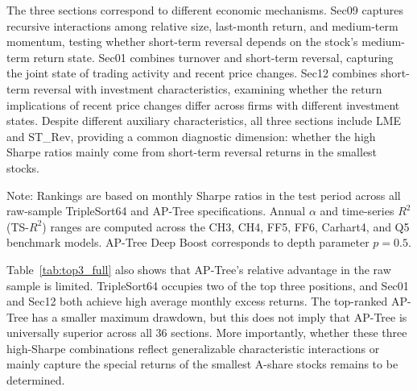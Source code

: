 \documentclass[12pt]{article}
\def\textit#1{#1}%
\begin{document}
The three sections correspond to different economic mechanisms. Sec09 captures recursive interactions among relative size, last-month return, and medium-term momentum, testing whether short-term reversal depends on the stock's medium-term return state. Sec01 combines turnover and short-term reversal, capturing the joint state of trading activity and recent price changes. Sec12 combines short-term reversal with investment characteristics, examining whether the return implications of recent price changes differ across firms with different investment states. Despite different auxiliary characteristics, all three sections include LME and ST\_Rev, providing a common diagnostic dimension: whether the high Sharpe ratios mainly come from short-term reversal returns in the smallest stocks.

\begin{table}[htbp]
\centering
\caption{Top Three Raw-Sample SDFs by Out-of-Sample Monthly Sharpe Ratio}
\label{tab:top3_full}
\begin{minipage}{0.96\textwidth}\footnotesize
\textit{Note:} Rankings are based on monthly Sharpe ratios in the test period across all raw-sample TripleSort64 and AP-Tree specifications. Annual \(\alpha\) and time-series \(R^2\) (TS-\(R^2\)) ranges are computed across the CH3, CH4, FF5, FF6, Carhart4, and Q5 benchmark models. AP-Tree Deep Boost corresponds to depth parameter \(p=0.5\).
\end{minipage}
\end{table}

Table~\ref{tab:top3_full} also shows that AP-Tree's relative advantage in the raw sample is limited. TripleSort64 occupies two of the top three positions, and Sec01 and Sec12 both achieve high average monthly excess returns. The top-ranked AP-Tree has a smaller maximum drawdown, but this does not imply that AP-Tree is universally superior across all 36 sections. More importantly, whether these three high-Sharpe combinations reflect generalizable characteristic interactions or mainly capture the special returns of the smallest A-share stocks remains to be determined.
\end{document}
